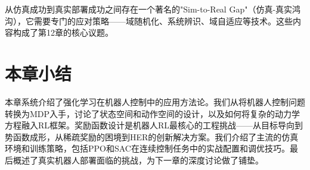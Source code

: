\begin{remark}
从仿真成功到真实部署成功之间存在一个著名的"Sim-to-Real Gap"（仿真-真实鸿沟），它需要专门的应对策略——域随机化、系统辨识、域自适应等技术。这些内容构成了第12章的核心议题。
\end{remark}

\section{本章小结}

本章系统介绍了强化学习在机器人控制中的应用方法论。我们从将机器人控制问题转换为MDP入手，讨论了状态空间和动作空间的设计，以及如何将复杂的动力学方程融入RL框架。奖励函数设计是机器人RL最核心的工程挑战——从目标导向到势函数成形，从稀疏奖励的困境到HER的创新解决方案。我们介绍了主流的仿真环境和训练策略，包括PPO和SAC在连续控制任务中的实战配置和调优技巧。最后概述了真实机器人部署面临的挑战，为下一章的深度讨论做了铺垫。

